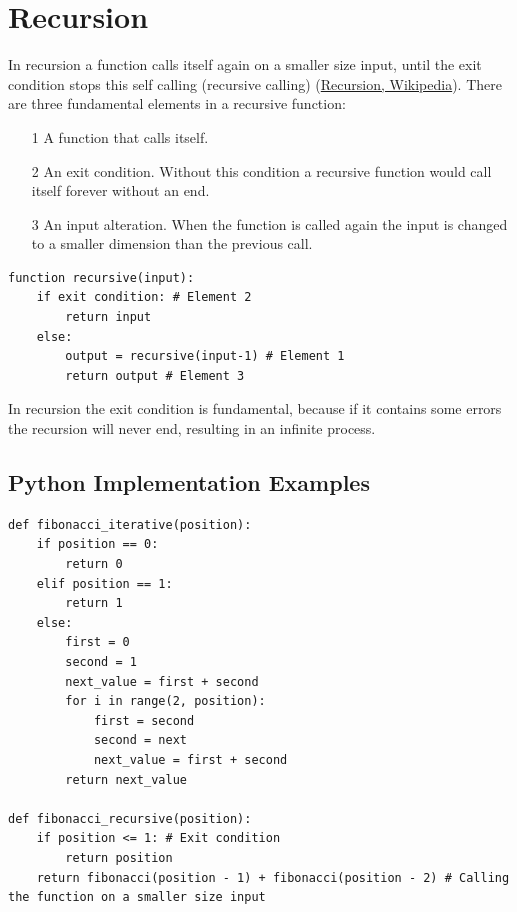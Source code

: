 \section{Recursion}
In recursion a function calls itself again on a smaller size input, until the exit condition stops this self calling (recursive calling) \cite{wikirecursion} (\href{https://en.wikipedia.org/wiki/Recursion_(computer_science)}{Recursion, Wikipedia}). There are three fundamental elements in a recursive function:
\begin{itemize}
\item[1] A function that calls itself.
\item[2] An exit condition. Without this condition a recursive function would call itself forever without an end.
\item[3] An input alteration. When the function is called again the input is changed to a smaller dimension than the previous call.
\end{itemize}

\begin{lstlisting}[numbers=none, caption={Pseudocode of a recursive function and its internal execution.}]
function recursive(input):
	if exit condition: # Element 2
		return input
	else:
		output = recursive(input-1) # Element 1
		return output # Element 3
\end{lstlisting}

In recursion the exit condition is fundamental, because if it contains some errors the recursion will never end, resulting in an infinite process.

\subsection{Python Implementation Examples}

\begin{lstlisting}[firstnumber=1, caption={Implementation of the Fibonacci series with both iterative and recursive way.}]
def fibonacci_iterative(position):
	if position == 0:
		return 0
	elif position == 1:
		return 1
	else:
		first = 0
		second = 1
		next_value = first + second
		for i in range(2, position):
			first = second
			second = next
			next_value = first + second
		return next_value

def fibonacci_recursive(position):
	if position <= 1: # Exit condition
		return position
	return fibonacci(position - 1) + fibonacci(position - 2) # Calling the function on a smaller size input
\end{lstlisting}

